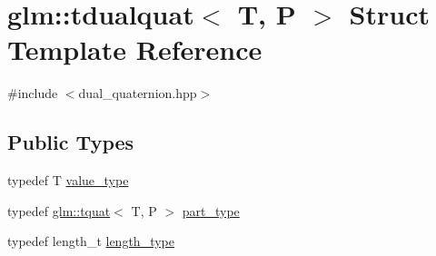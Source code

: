 \hypertarget{structglm_1_1tdualquat}{}\section{glm\+:\+:tdualquat$<$ T, P $>$ Struct Template Reference}
\label{structglm_1_1tdualquat}


{\ttfamily \#include $<$dual\+\_\+quaternion.\+hpp$>$}

\subsection*{Public Types}
\begin{DoxyCompactItemize}
\item 
typedef T \hyperlink{structglm_1_1tdualquat_afcff3aadbc6e5c5672e2af653a5e401c}{value\+\_\+type}
\item 
typedef \hyperlink{structglm_1_1tquat}{glm\+::tquat}$<$ T, P $>$ \hyperlink{structglm_1_1tdualquat_a496a3e08262a28863cf7b0609eee7e5b}{part\+\_\+type}
\item 
typedef length\+\_\+t \hyperlink{structglm_1_1tdualquat_a8100706ca94a1aa6611874787a9be0ca}{length\+\_\+type}
\end{DoxyCompactItemize}
